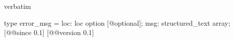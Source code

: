 \begin{camlexample}{verbatim}
\begin{caml}
\begin{camlinput}
type error_msg = { loc: loc option [@optional]; msg: structured_text array; } [@@since 0.1]
[@@version 0.1]
\end{camlinput}
\end{caml}
\end{camlexample}
